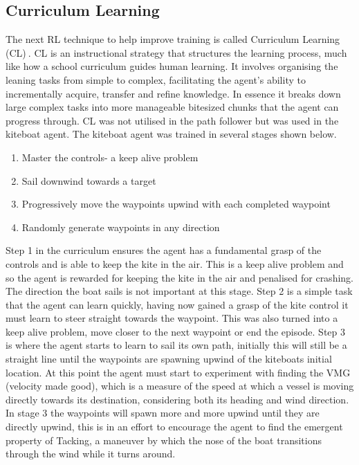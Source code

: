 \subsection{Curriculum Learning}
The next RL technique to help improve training is called Curriculum Learning (CL)$~$\cite{curriculumLearning}. CL is an instructional strategy that structures the learning process, much like how a school curriculum guides human learning. It involves organising the leaning tasks from simple to complex, facilitating the agent's ability to incrementally acquire, transfer and refine knowledge. In essence it breaks down large complex tasks into more manageable bitesized chunks that the agent can progress through. CL was not utilised in the path follower but was used in the kiteboat agent. The kiteboat agent was trained in several stages shown below.
\begin{enumerate}
    \item Master the controls- a keep alive problem
    \item Sail downwind towards a target
    \item Progressively move the waypoints upwind with each completed waypoint
    \item Randomly generate waypoints in any direction 
\end{enumerate}

Step 1 in the curriculum ensures the agent has a fundamental grasp of the controls and is able to keep the kite in the air. This is a keep alive problem and so the agent is rewarded for keeping the kite in the air and penalised for crashing. The direction the boat sails is not important at this stage. Step 2 is a simple task that the agent can learn quickly, having now gained a grasp of the kite control it must learn to steer straight towards the waypoint. This was also turned into a keep alive problem, move closer to the next waypoint or end the episode. Step 3 is where the agent starts to learn to sail its own path, initially this will still be a straight line until the waypoints are spawning upwind of the kiteboats initial location. At this point the agent must start to experiment with finding the VMG (velocity made good), which is a measure of the speed at which a vessel is moving directly towards its destination, considering both its heading and wind direction. In stage 3 the waypoints will spawn more and more upwind until they are directly upwind, this is in an effort to encourage the agent to find the emergent property of Tacking, a maneuver by which the nose of the boat transitions through the wind while it turns around.  

